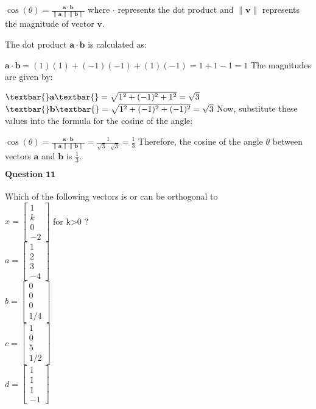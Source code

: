 \documentclass[11pt]{article}
\begin{document}
$ \cos(\theta) =
\frac{\mathbf{a} \cdot \mathbf{b}}{\|\mathbf{a}\| \|\mathbf{b}\|} $
where $\cdot$ represents the dot product and $\|\mathbf{v}\|$
represents the magnitude of vector $\mathbf{v}$.

The dot product $\mathbf{a} \cdot \mathbf{b}$ is calculated as:

$ \mathbf{a} \cdot \mathbf{b} = (1)(1) + (-1)(-1) + (1)(-1) = 1 + 1 - 1
= 1 $ The magnitudes are given by:

$ \textbar{}\mathbf{a}\textbar{} = \sqrt{1^2 + (-1)^2 + 1^2} = \sqrt{3}
$ $ \textbar{}\mathbf{b}\textbar{} = \sqrt{1^2 + (-1)^2 + (-1)^2} =
\sqrt{3} $ Now, substitute these values into the formula for the cosine
of the angle:

$ \cos(\theta) =
\frac{\mathbf{a} \cdot \mathbf{b}}{\|\mathbf{a}\| \|\mathbf{b}\|} =
\frac{1}{\sqrt{3} \cdot \sqrt{3}} = \frac{1}{3} $ Therefore, the cosine
of the angle $\theta$ between vectors $\mathbf{a}$ and
$\mathbf{b}$ is $\frac{1}{3}$.

    $\textbf{Question 11}$\\
~\\
Which of the following vectors is or can be orthogonal to\\
$x=\begin{bmatrix} 1 \\ k \\ 0 \\-2 \end{bmatrix}$ for k\textgreater0
?\\
$a=\begin{bmatrix} 1 \\ 2 \\ 3 \\-4 \end{bmatrix}$\\
$b=\begin{bmatrix} 0 \\ 0 \\ 0 \\ 1/4 \end{bmatrix}$\\
$c=\begin{bmatrix} 1 \\ 0 \\ 5 \\ 1/2 \end{bmatrix}$\\
$d=\begin{bmatrix} 1 \\ 1 \\ 1 \\ -1 \end{bmatrix}$
\end{document}
